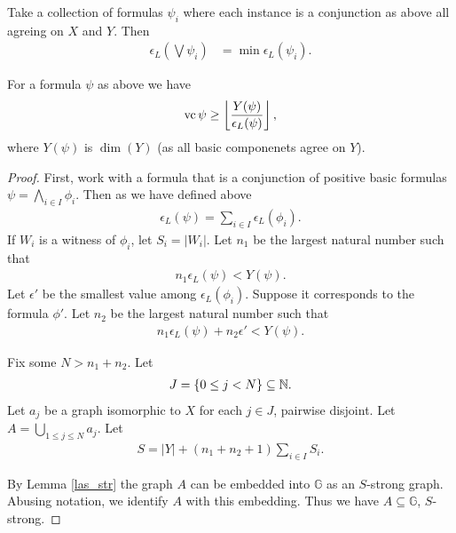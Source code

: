 \documentclass{amsart}
\newcommand{\GG}{\mathbb G}
\newcommand{\X}{X}
\newcommand{\Y}{Y}
\newcommand{\curly}[1]{\left\{#1\right\}}
\newcommand{\paren}[1]{\left(#1\right)}
\providecommand{\floor}[1]{\left \lfloor #1 \right \rfloor }
\begin{document}
\begin{Definition} [Disjunction]
  Take a collection of formulas $\psi_i$ where each instance is a conjunction as above all agreing on $\X$ and $\Y$.
  Then
  \begin{align*}
    \epsilon_L\paren{\bigvee \psi_i} &= \min \epsilon_L(\psi_i).
  \end{align*}
\end{Definition}
\begin{Theorem}
  For a formula $\psi$ as above we have
  \begin{align*}
    \vc \psi \geq \floor{\frac{Y(\psi)}{\epsilon_L(\psi)}},
  \end{align*}
  where $Y(\psi)$ is $\dim(Y)$ (as all basic componenets agree on $\Y$).
\end{Theorem}
\begin{proof}
  First, work with a formula that is a conjunction of positive basic formulas $\psi = \bigwedge_{i \in I} \phi_i$.
  Then as we have defined above
  \begin{align*}
    \epsilon_L(\psi) = \sum_{i \in I} \epsilon_L(\phi_i).
  \end{align*}
  If $W_i$ is a witness of $\phi_i$, let $S_i = |W_i|$.
  Let $n_1$ be the largest natural number such that
  \begin{align*}
    n_1 \epsilon_L(\psi) < Y(\psi).
  \end{align*}
  Let $\epsilon'$ be the smallest value among $\epsilon_L(\phi_i)$.
  Suppose it corresponds to the formula $\phi'$.
  Let $n_2$ be the largest natural number such that
  \begin{align*}
    n_1 \epsilon_L(\psi) + n_2 \epsilon' < Y(\psi).
  \end{align*}

  Fix some $N > n_1 + n_2$.
  Let 
  \begin{align*}
    J = \curly{0 \leq j < N} \subseteq \N.
  \end{align*}
  Let $a_j$ be a graph isomorphic to $\X$ for each $j \in J$, pairwise disjoint.
  Let $A = \bigcup_{1 \leq j \leq N} a_j$.
  Let 
  \begin{align*}
    S = |Y| + (n_1 + n_2 + 1) \sum_{i \in I} S_i.
  \end{align*}

  By Lemma \ref{las_str} the graph $A$ can be embedded into $\GG$ as an $S$-strong graph. 
  Abusing notation, we identify $A$ with this embedding.
  Thus we have $A \subseteq \GG$, $S$-strong. 


\end{proof}
\end{document}

